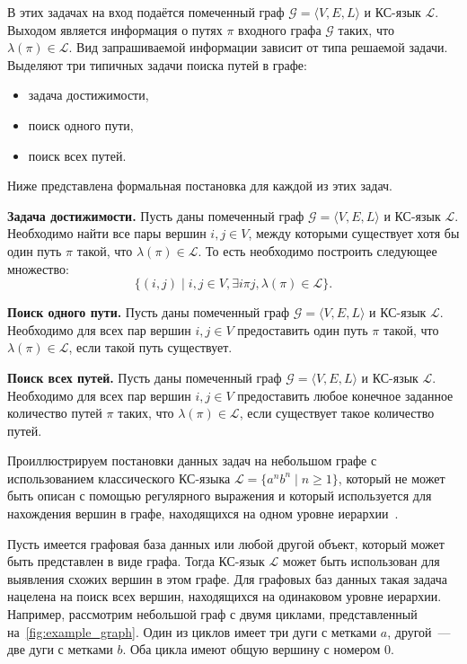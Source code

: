 В этих задачах на вход подаётся помеченный граф $\mathcal{G} = \langle V, E, L \rangle$ и КС-язык $\mathcal{L}$. Выходом является информация о путях $\pi$ входного графа $\mathcal{G}$ таких, что $\lambda(\pi) \in \mathcal{L}$. Вид запрашиваемой информации зависит от типа решаемой задачи. Выделяют три типичных задачи поиска путей в графе:

\begin{itemize}
\item задача достижимости,
\item поиск одного пути,
\item поиск всех путей.
\end{itemize}

 Ниже представлена формальная постановка для каждой из этих задач.

\textbf{Задача достижимости.} Пусть даны помеченный граф $\mathcal{G} = \langle V, E, L \rangle$ и КС-язык $\mathcal{L}$. Необходимо найти все пары вершин $i, j \in V$, между которыми существует хотя бы один путь $\pi$ такой, что $\lambda(\pi) \in \mathcal{L}$. То есть необходимо построить следующее множество: $$\{(i, j) \mid i, j \in V, \exists i \pi j, \lambda(\pi) \in \mathcal{L}\}.$$

\textbf{Поиск одного пути.} Пусть даны помеченный граф $\mathcal{G} = \langle V, E, L \rangle$ и КС-язык $\mathcal{L}$. Необходимо для всех пар вершин $i, j \in V$ предоставить один путь $\pi$ такой, что $\lambda(\pi) \in \mathcal{L}$, если такой путь существует.

\textbf{Поиск всех путей.} Пусть даны помеченный граф $\mathcal{G} = \langle V, E, L \rangle$ и КС-язык $\mathcal{L}$. Необходимо для всех пар вершин $i, j \in V$ предоставить любое конечное заданное количество путей $\pi$ таких, что $\lambda(\pi) \in \mathcal{L}$, если существует такое количество путей.

Проиллюстрируем постановки данных задач на небольшом графе с использованием классического КС-языка $\mathcal{L} = \{a^nb^n \mid n \geq 1\}$, который не может быть описан с помощью регулярного выражения и который используется для нахождения вершин в графе, находящихся на одном уровне иерархии~\cite{abiteboul1995foundations}.

Пусть имеется графовая база данных или любой другой объект, который может быть представлен в виде графа. Тогда КС-язык $\mathcal{L}$ может быть использован для выявления схожих вершин в этом графе. Для графовых баз данных такая задача нацелена на поиск всех вершин, находящихся на одинаковом уровне иерархии. Например, рассмотрим небольшой граф с двумя циклами, представленный на~\cref{fig:example_graph}. Один из циклов имеет три дуги с метками $a$, другой~--- две дуги с метками $b$. Оба цикла имеют общую вершину с номером $0$.

